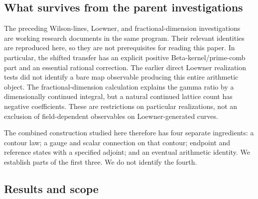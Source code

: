 \subsection{What survives from the parent investigations}

The preceding Wilson-lines, Loewner, and fractional-dimension
investigations~\cite{ParentWilson,ParentLoewner,ParentFractional} are
working research documents in the same program. Their relevant
identities are reproduced here, so they are not prerequisites for
reading this paper. In particular, the shifted transfer has an explicit
positive Beta-kernel/prime-comb part and an essential rational correction.
The earlier direct Loewner realization tests did not identify a bare
map observable producing this entire arithmetic object. The
fractional-dimension calculation explains the gamma ratio by a
dimensionally continued integral, but a natural continued lattice count
has negative coefficients. These are restrictions on particular
realizations, not an exclusion of field-dependent observables on
Loewner-generated curves.

The combined construction studied here therefore has four separate
ingredients: a contour law; a gauge and scalar connection on that
contour; endpoint and reference states with a specified adjoint; and
an eventual arithmetic identity. We establish parts of the first three.
We do not identify the fourth.

\subsection{Results and scope}

